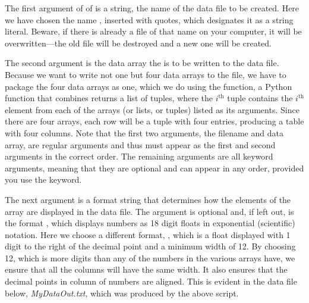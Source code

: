 \documentclass[letterpaper,10pt,english]{sphinxmanual}
\begin{document}
The first argument of of  is a string, the name of the data file to be created.  Here we have chosen the name , inserted with quotes, which designates it as a string literal.  Beware, if there is already a file of that name on your computer, it will be overwritten---the old file will be destroyed and a new one will be created.

The second argument is the data array the is to be written to the data file.  Because we want to write not one but four data arrays to the file, we have to package the four data arrays as one, which we do using the  function, a Python function that combines returns a list of tuples, where the \(i^\mathrm{th}\) tuple contains the \(i^\mathrm{th}\) element from each of the arrays (or lists, or tuples) listed as its arguments.  Since there are four arrays, each row will be a tuple with four entries, producing a table with four columns.  Note that the first two arguments, the filename and data array, are regular arguments and thus must appear as the first and second arguments in the correct order.  The remaining arguments are all keyword arguments, meaning that they are optional and can appear in any order, provided you use the keyword.

The next argument is a format string that determines how the elements of the array are displayed in the data file.  The argument is optional and, if left out, is the format , which displays numbers as 18 digit floats in exponential (scientific) notation.  Here we choose a different format, , which is a float displayed with 1 digit to the right of the decimal point and a minimum width of 12.  By choosing 12, which is more digits than any of the numbers in the various arrays have, we ensure that all the columns will have the same width.  It also ensures that the decimal points in column of numbers are aligned.   This is evident in the data file below, \emph{MyDataOut.txt}, which was produced by the above script.
\end{document}
